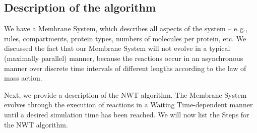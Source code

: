 \documentclass[copyright]{eptcs}
\begin{document}
\subsection{Description of the algorithm}\label{NWT}

We have a Membrane System, which describes all aspects of the system -- e.\,g., rules, compartments, protein types, numbers of molecules per protein, etc.  We discussed the fact that our Membrane System will not evolve in a typical (maximally parallel) manner, because the reactions occur in an asynchronous manner over discrete time intervals of different lengths according to the law of mass action.

Next, we provide a description of the NWT algorithm.  The Membrane System evolves through the execution of reactions in a Waiting Time-dependent manner until a desired simulation time has been reached.  We will now list the Steps for the NWT algorithm.
\end{document}
